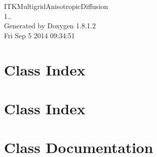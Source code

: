 \documentclass{book}
\begin{document}
\hypersetup{pageanchor=false,citecolor=blue}
\begin{titlepage}
\vspace*{7cm}
\begin{center}
{\Large I\-T\-K\-Multigrid\-Anisotropic\-Diffusion \\[1ex]\large 1.. }\\
\vspace*{1cm}
{\large Generated by Doxygen 1.8.1.2}\\
\vspace*{0.5cm}
{\small Fri Sep 5 2014 09:34:51}\\
\end{center}
\end{titlepage}
\clearemptydoublepage
{}
\tableofcontents
\clearemptydoublepage
{}
\hypersetup{pageanchor=true,citecolor=blue}
\chapter{Class Index}

\chapter{Class Index}

\chapter{Class Documentation}













\printindex
\end{document}

